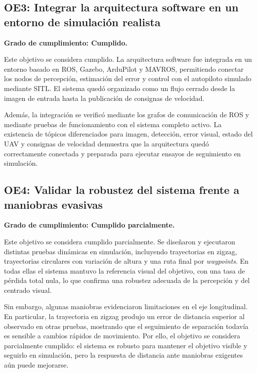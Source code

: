 \vspace{0.3cm}

\subsection*{\textbf{OE3: Integrar la arquitectura software en un entorno de simulación realista}}

\textbf{Grado de cumplimiento: Cumplido.}

Este objetivo se considera cumplido. La arquitectura software fue integrada en un entorno basado en ROS, Gazebo, ArduPilot y MAVROS, permitiendo conectar los nodos de percepción, estimación del error y control con el autopiloto simulado mediante SITL. El sistema quedó organizado como un flujo cerrado desde la imagen de entrada hasta la publicación de consignas de velocidad.

\vspace{0.2cm}

Además, la integración se verificó mediante los grafos de comunicación de ROS y mediante pruebas de funcionamiento con el sistema completo activo. La existencia de tópicos diferenciados para imagen, detección, error visual, estado del UAV y consignas de velocidad demuestra que la arquitectura quedó correctamente conectada y preparada para ejecutar ensayos de seguimiento en simulación.

\vspace{0.3cm}

\subsection*{\textbf{OE4: Validar la robustez del sistema frente a maniobras evasivas}}

\textbf{Grado de cumplimiento: Cumplido parcialmente.}

Este objetivo se considera cumplido parcialmente. Se diseñaron y ejecutaron distintas pruebas dinámicas en simulación, incluyendo trayectorias en zigzag, trayectorias circulares con variación de altura y una ruta final por \textit{waypoints}. En todas ellas el sistema mantuvo la referencia visual del objetivo, con una tasa de pérdida total nula, lo que confirma una robustez adecuada de la percepción y del centrado visual.

\vspace{0.2cm}

Sin embargo, algunas maniobras evidenciaron limitaciones en el eje longitudinal. En particular, la trayectoria en zigzag produjo un error de distancia superior al observado en otras pruebas, mostrando que el seguimiento de separación todavía es sensible a cambios rápidos de movimiento. Por ello, el objetivo se considera parcialmente cumplido: el sistema es robusto para mantener el objetivo visible y seguirlo en simulación, pero la respuesta de distancia ante maniobras exigentes aún puede mejorarse.

